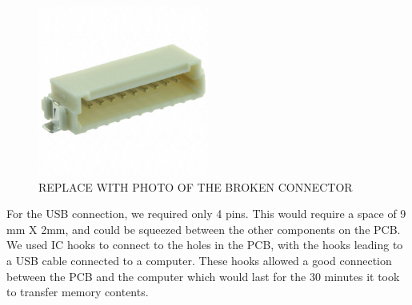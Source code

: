 \begin{figure}
\begin{center}
\includegraphics[width=0.5\textwidth]{images/ConnectorWhole.JPG}
\caption{REPLACE WITH PHOTO OF THE BROKEN CONNECTOR}
\label{Fig:ConnectorCut}
\end{center}
\end{figure}

For the USB connection, we required only 4 pins.
This would require a space of 9 mm X 2mm,
and could be squeezed between the other components on the PCB.
We used IC hooks to connect to the holes in the PCB,
with the hooks leading to a USB cable connected to a computer.
These hooks allowed a good connection between the PCB and the computer which would last for the 30 minutes it took to transfer memory contents.